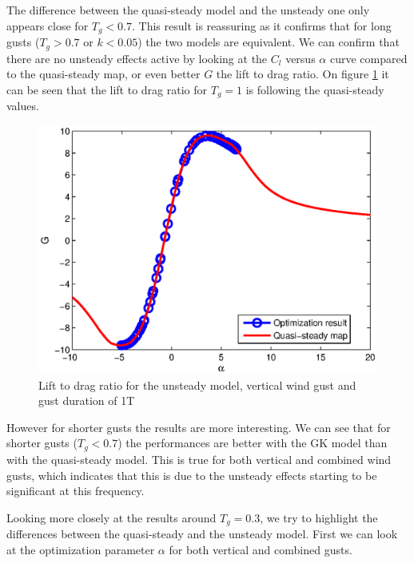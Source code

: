 \par The difference between the quasi-steady model and the unsteady one only appears close for $T_g<0.7$.
This result is reassuring as it confirms that for long gusts ($T_g>0.7$ or $k<0.05$) the two models are equivalent.
We can confirm that there are no unsteady effects active by looking at the $C_l$ versus $\alpha$ curve compared to the quasi-steady map, or even better $G$ the lift to drag ratio.
On figure \ref{fig:G_vs_alpha_wt=1_Tg=1_GK.eps} it can be seen that the lift to drag ratio for $T_g=1$ is following the quasi-steady values.

\begin{figure}[h]
  \centering
  \includegraphics{./Figures/G_vs_alpha_wt=1_Tg=1_GK.eps}
  \caption{Lift to drag ratio for the unsteady model, vertical wind gust and gust duration of 1T}
  \label{fig:G_vs_alpha_wt=1_Tg=1_GK.eps}
\end{figure}

\par However for shorter gusts the results are more interesting.
We can see that for shorter gusts ($T_g<0.7$) the performances are better with the GK model than with the quasi-steady model.
This is true for both vertical and combined wind gusts, which indicates that this is due to the unsteady effects starting to be significant at this frequency.

\FloatBarrier

\par Looking more closely at the results around $T_g=0.3$, we try to highlight the differences between the quasi-steady and the unsteady model.
First we can look at the optimization parameter $\alpha$ for both vertical and combined gusts.

